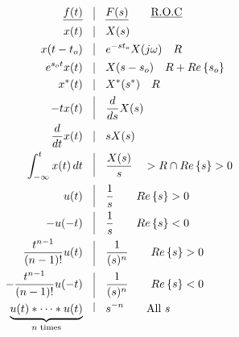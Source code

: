 \begin{multicols}{2}

\begin{equation*}
  \begin{split}
    \underline{f(t)}\quad&\vline\quad\underline{F(s)}\quad\quad \text{\underline{R.O.C}}\\
    x(t)\quad&\vline\quad X(s)\\
    x(t-t_o)\quad&\vline\quad e^{-st_o}X(j\omega)\quad R\\
    e^{s_ot}x(t)\quad&\vline\quad X(s-s_o)\quad R+Re\left\{ s_o \right\}\\
    x^*(t)\quad&\vline\quad X^*(s^*)\quad R\\
    -tx(t)\quad&\vline\quad \frac{d}{ds}X(s)\\
    \frac{d}{dt}x(t)\quad&\vline\quad sX(s)\\
  \int_{-\infty}^{t} x(t)\,dt\quad&\vline\quad \frac{X(s)}{s}\quad >R\cap Re\left\{ s \right\}>0\\
    u(t)\quad&\vline\quad \frac{1}{s}\quad\quad Re\left\{ s \right\}>0\\
    -u(-t)\quad&\vline\quad \frac{1}{s}\quad\quad Re\left\{ s \right\}<0\\
    \frac{t^{n-1}}{(n-1)!}u(t)\quad&\vline\quad \frac{1}{(s)^n}\quad\quad Re\left\{ s \right\}>0\\
    -\frac{t^{n-1}}{(n-1)!}u(-t)\quad&\vline\quad \frac{1}{(s)^n}\quad\quad Re\left\{ s \right\}<0\\
    \underbrace{u(t)*\cdots*u(t)}_{n\text{ times}} \quad&\vline\quad s^{-n}\quad\quad \text{All }s
  \end{split}
  \label{5}
  \end{equation*}
    

\end{multicols}

